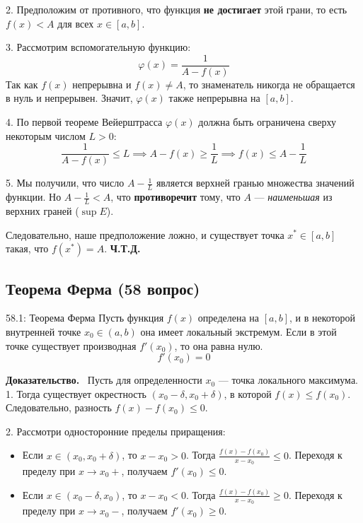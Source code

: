 \documentclass[a4paper,12pt]{article}
\newcommand{\myproof}{\textbf{Доказательство.}\ }
\begin{document}
	2. Предположим от противного, что функция \textbf{не достигает} этой грани, то есть $f(x) < A$ для всех $x \in [a, b]$.
	
	3. Рассмотрим вспомогательную функцию:
	$$ \varphi(x) = \frac{1}{A - f(x)} $$
	Так как $f(x)$ непрерывна и $f(x) \neq A$, то знаменатель никогда не обращается в нуль и непрерывен. Значит, $\varphi(x)$ также непрерывна на $[a, b]$.
	
	4. По первой теореме Вейерштрасса $\varphi(x)$ должна быть ограничена сверху некоторым числом $L > 0$:
	$$ \frac{1}{A - f(x)} \leq L \implies A - f(x) \geq \frac{1}{L} \implies f(x) \leq A - \frac{1}{L} $$
	
	5. Мы получили, что число $A - \frac{1}{L}$ является верхней гранью множества значений функции. Но $A - \frac{1}{L} < A$, что \textbf{противоречит} тому, что $A$ — \textit{наименьшая} из верхних граней ($\sup E$).
	
	Следовательно, наше предположение ложно, и существует точка $x^* \in [a, b]$ такая, что $f(x^*) = A$. \textbf{Ч.Т.Д.}
	
	
	
	
	\newpage
	\subsection{Теорема Ферма (58 вопрос)}
	
	\begin{theorembox}{58.1: Теорема Ферма}
		Пусть функция $f(x)$ определена на $[a, b]$, и в некоторой внутренней точке $x_0 \in (a, b)$ она имеет локальный экстремум. Если в этой точке существует производная $f'(x_0)$, то она равна нулю.
		$$ f'(x_0) = 0 $$
	\end{theorembox}
	
	\myproof
	Пусть для определенности $x_0$ --- точка локального максимума. 
	1. Тогда существует окрестность $(x_0 - \delta, x_0 + \delta)$, в которой $f(x) \leq f(x_0)$. Следовательно, разность $f(x) - f(x_0) \leq 0$.
	
	2. Рассмотри односторонние пределы приращения:
	\begin{itemize}
		\item Если $x \in (x_0, x_0 + \delta)$, то $x - x_0 > 0$. Тогда $\frac{f(x) - f(x_0)}{x - x_0} \leq 0$. Переходя к пределу при $x \to x_0+$, получаем $f'(x_0) \leq 0$.
		\item Если $x \in (x_0 - \delta, x_0)$, то $x - x_0 < 0$. Тогда $\frac{f(x) - f(x_0)}{x - x_0} \geq 0$. Переходя к пределу при $x \to x_0-$, получаем $f'(x_0) \geq 0$.
	\end{itemize}
	
\end{document}
